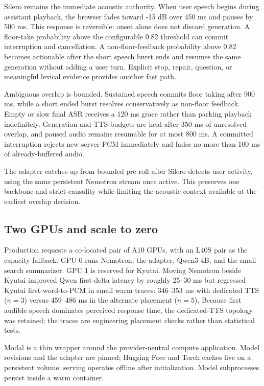 \documentclass[10pt,twocolumn]{article}
\begin{document}
Silero remains the immediate acoustic authority. When user speech begins during assistant playback,
the browser fades toward -15 dB over 450 ms and pauses by 500 ms. This response is reversible: onset
alone does not discard generation. A floor-take probability above the configurable 0.82 threshold
can commit interruption and cancellation. A non-floor-feedback probability above 0.82 becomes
actionable after the short speech burst ends and resumes the same generation without adding a user
turn. Explicit stop, repair, question, or meaningful lexical evidence provides another fast path.

Ambiguous overlap is bounded. Sustained speech commits floor taking after 900 ms, while a short
ended burst resolves conservatively as non-floor feedback. Empty or slow final ASR receives a
120 ms grace rather than parking playback indefinitely. Generation and TTS budgets are held after
350 ms of unresolved overlap, and paused audio remains resumable for at most 800 ms. A committed
interruption rejects new server PCM immediately and fades no more than 100 ms of already-buffered
audio.

The adapter catches up from bounded pre-roll after Silero detects user activity, using the same
persistent Nemotron stream once active. This preserves one backbone and strict causality while
limiting the acoustic context available at the earliest overlap decision.

\subsection{Two GPUs and scale to zero}

Production requests a co-located pair of A10 GPUs, with an L40S pair as the capacity fallback.
GPU 0 runs Nemotron, the adapter, Qwen3-4B, and
the small search summarizer. GPU 1 is reserved for Kyutai. Moving Nemotron beside Kyutai improved
Qwen first-delta latency by roughly 25--30 ms but regressed Kyutai first-word-to-PCM in small warm
traces: 346--353 ms with dedicated TTS ($n=3$) versus 459--486 ms in the alternate placement
($n=5$). Because first audible speech dominates perceived response time, the dedicated-TTS
topology was retained; the traces are engineering placement checks rather than statistical tests.

Modal \cite{modal} is a thin wrapper around the provider-neutral compute application. Model revisions and the
adapter are pinned; Hugging Face and Torch caches live on a persistent volume; serving operates
offline after initialization. Model subprocesses persist inside a warm container.
\end{document}
